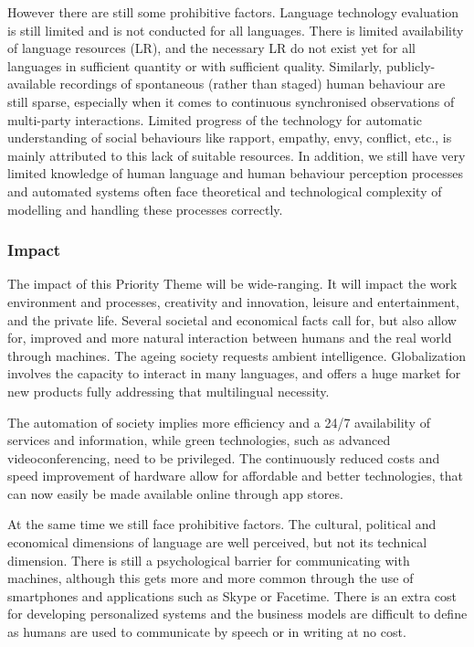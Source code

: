 \documentclass[10pt, plain]{../../metanetpaper}
\begin{document}
\begin{multicols}{2}
However there are still some prohibitive factors. Language technology evaluation is still limited and is not conducted for all languages. There is limited availability of language resources (LR), and the necessary LR do not exist yet for all languages in sufficient quantity or with sufficient quality. Similarly, publicly-available recordings of spontaneous (rather than staged) human behaviour are still sparse, especially when it comes to continuous synchronised observations of multi-party interactions. Limited progress of the technology for automatic understanding of social behaviours like rapport, empathy, envy, conflict, etc., is mainly attributed to this lack of suitable resources. In addition, we still have very limited knowledge of human language and human behaviour perception processes and automated systems often face theoretical and technological complexity of modelling and handling these processes correctly.

\subsubsection{Impact}
\label{sec:impact-pt3}

The impact of this Priority Theme will be wide-ranging. It will impact the work environment and processes, creativity and innovation, leisure and entertainment, and the private life. Several societal and economical facts call for, but also allow for, improved and more natural interaction between humans and the real world through machines. The ageing society requests ambient intelligence. Globalization involves the capacity to interact in many languages, and offers a huge market for new products fully addressing that multilingual necessity.
 
The automation of society implies more efficiency and a 24/7 availability of services and information, while green technologies, such as advanced videoconferencing, need to be privileged. The continuously reduced costs and speed improvement of hardware allow for affordable and better technologies, that can now easily be made available online through app stores.
 
At the same time we still face prohibitive factors. The cultural, political and economical dimensions of language are well perceived, but not its technical dimension. There is still a psychological barrier for communicating with machines, although this gets more and more common through the use of smartphones and applications such as Skype or Facetime. There is an extra cost for developing personalized systems and the business models are difficult to define as humans are used to communicate by speech or in writing at no cost.


\end{multicols}
\end{document}
